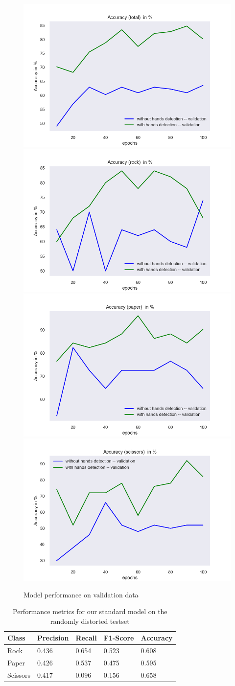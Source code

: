 \documentclass[a4paper]{article}
\begin{document}
\begin{figure}[H]
    \includegraphics[width=.49\textwidth]{img/experiment/model_comp_10steps__val_acc_total.png}\hfill
    \includegraphics[width=.49\textwidth]{img/experiment/model_comp_10steps__val_acc_rock.png}\hfill
    \\[\smallskipamount]
    \includegraphics[width=.49\textwidth]{img/experiment/model_comp_10steps__val_acc_paper.png}\hfill
    \includegraphics[width=.49\textwidth]{img/experiment/model_comp_10steps__val_acc_scissors.png}\hfill
    \caption{Model performance on validation data}
    \label{fig:exp-de-acc-val}
\end{figure}

\begin{table}[H]
	\centering
	\caption{Performance metrics for our standard model on the randomly distorted testset}
	\label{tbl:metrics_model_rm}
	\begin{tabular}{@{}lllll@{}}
		\toprule
		Class    & Precision & Recall & F1-Score & Accuracy \\ \midrule
		Rock     & 0.436     & 0.654  & 0.523    & 0.608    \\
		Paper    & 0.426     & 0.537  & 0.475    & 0.595    \\
		Scissors & 0.417     & 0.096  & 0.156    & 0.658    \\ \bottomrule
	\end{tabular}
\end{table}
\end{document}
